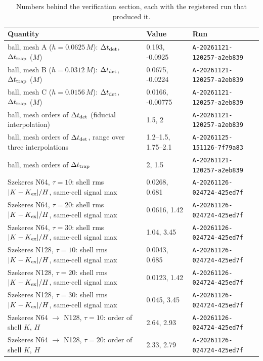 \begin{table}
\caption{\label{tab:ledger_g2}Numbers behind the verification section, each with the registered run that produced it.}
\begin{ruledtabular}
\begin{tabular}{lll}
Quantity & Value & Run \\ \hline
ball, mesh A ($h = 0.0625\,M$): $\Delta t_{\rm det}$, $\Delta t_{\rm trap}$ ($M$) & 0.193, -0.0925 & \texttt{A-20261121-120257-a2eb839} \\
ball, mesh B ($h = 0.0312\,M$): $\Delta t_{\rm det}$, $\Delta t_{\rm trap}$ ($M$) & 0.0675, -0.0224 & \texttt{A-20261121-120257-a2eb839} \\
ball, mesh C ($h = 0.0156\,M$): $\Delta t_{\rm det}$, $\Delta t_{\rm trap}$ ($M$) & 0.0166, -0.00775 & \texttt{A-20261121-120257-a2eb839} \\
ball, mesh orders of $\Delta t_{\rm det}$ (fiducial interpolation) & 1.5, 2 & \texttt{A-20261121-120257-a2eb839} \\
ball, mesh orders of $\Delta t_{\rm det}$, range over three interpolations & 1.2--1.5, 1.75--2.1 & \texttt{A-20261125-151126-7f79a83} \\
ball, mesh orders of $\Delta t_{\rm trap}$ & 2, 1.5 & \texttt{A-20261121-120257-a2eb839} \\
Szekeres N64, $\tau = 10$: shell rms $|K-K_{\rm ex}|/H$, same-cell signal max & 0.0268, 0.681 & \texttt{A-20261126-024724-425ed7f} \\
Szekeres N64, $\tau = 20$: shell rms $|K-K_{\rm ex}|/H$, same-cell signal max & 0.0616, 1.42 & \texttt{A-20261126-024724-425ed7f} \\
Szekeres N64, $\tau = 30$: shell rms $|K-K_{\rm ex}|/H$, same-cell signal max & 1.04, 3.45 & \texttt{A-20261126-024724-425ed7f} \\
Szekeres N128, $\tau = 10$: shell rms $|K-K_{\rm ex}|/H$, same-cell signal max & 0.0043, 0.685 & \texttt{A-20261126-024724-425ed7f} \\
Szekeres N128, $\tau = 20$: shell rms $|K-K_{\rm ex}|/H$, same-cell signal max & 0.0123, 1.42 & \texttt{A-20261126-024724-425ed7f} \\
Szekeres N128, $\tau = 30$: shell rms $|K-K_{\rm ex}|/H$, same-cell signal max & 0.045, 3.45 & \texttt{A-20261126-024724-425ed7f} \\
Szekeres N64 $\to$ N128, $\tau = 10$: order of shell $K$, $H$ & 2.64, 2.93 & \texttt{A-20261126-024724-425ed7f} \\
Szekeres N64 $\to$ N128, $\tau = 20$: order of shell $K$, $H$ & 2.33, 2.79 & \texttt{A-20261126-024724-425ed7f} \\

\end{tabular}
\end{ruledtabular}
\end{table}

